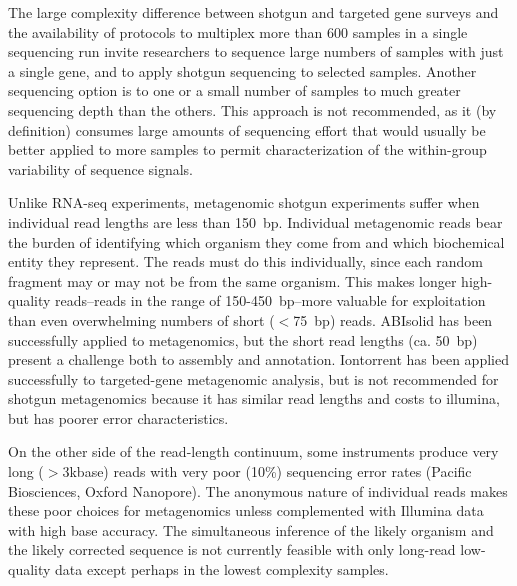 \documentclass[graybox]{svmult}
\begin{document}
The large complexity difference between shotgun and targeted gene surveys and the availability of protocols to multiplex more than 600 samples in a single sequencing run invite researchers to sequence large numbers of samples with just a single gene, and to apply shotgun sequencing to selected samples.   Another sequencing option is to one or a small number of samples to much greater sequencing depth than the others.  This approach is not recommended, as it (by definition) consumes large amounts of sequencing effort that would usually be better applied to more samples to permit characterization of the within-group variability of sequence signals.

Unlike RNA-seq experiments, metagenomic shotgun experiments suffer when individual read lengths are less than 150~bp.  Individual metagenomic reads bear the burden of identifying which organism they come from and which biochemical entity they represent.  The reads must do this individually, since each random fragment may or may not be from the same organism.  This makes longer high-quality reads--reads in the range of 150-450~bp--more valuable for exploitation than even overwhelming numbers of short ($<$75~bp) reads.   
ABIsolid has been successfully applied to metagenomics\cite{Iverson2012Untangling}, but the short read lengths (ca. 50~bp) present a challenge both to assembly and annotation.
Iontorrent has been applied successfully to targeted-gene metagenomic analysis, but is not recommended for shotgun metagenomics because it has similar read lengths and costs to illumina, but has poorer error characteristics.

On the other side of the read-length continuum, some instruments produce very long ($>$3kbase) reads with very poor (10\%) sequencing error rates (Pacific Biosciences, Oxford Nanopore).   The anonymous nature of individual reads makes these poor choices for metagenomics unless complemented with Illumina data with high base accuracy.  The simultaneous inference of the likely organism and the likely corrected sequence is not currently feasible with only long-read low-quality data except perhaps in the lowest complexity samples. 
\end{document}
